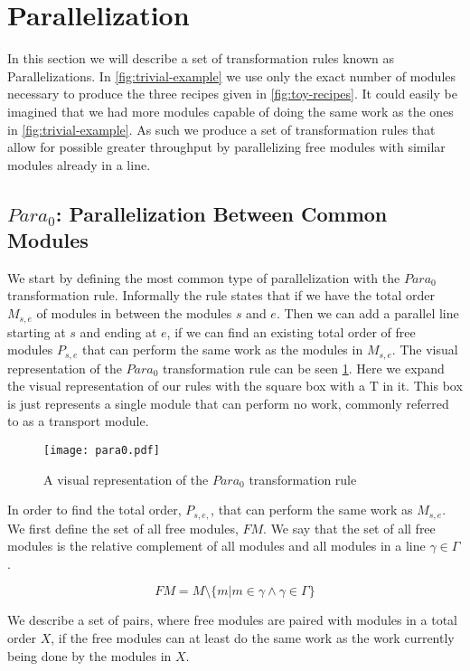 \section{Parallelization}
In this section we will describe a set of transformation rules known as Parallelizations. In \cref{fig:trivial-example} we use only the exact number of modules necessary to produce the three recipes given in \cref{fig:toy-recipes}. It could easily be imagined that we had more modules capable of doing the same work as the ones in \cref{fig:trivial-example}. As such we produce a set of transformation rules that allow for possible greater throughput by parallelizing free modules with similar modules already in a line.


\subsection{$Para_0$: Parallelization Between Common Modules}
We start by defining the most common type of parallelization with the $Para_0$ transformation rule. Informally the rule states that if we have the total order $M_{s,e}$ of modules in between the modules $s$ and $e$. Then we can add a parallel line starting at $s$ and ending at $e$, if we can find an existing total order of free modules $P_{s,e}$ that can perform the same work as the modules in $M_{s,e}$. The visual representation of the $Para_0$ transformation rule can be seen \cref{fig:para0}. Here we expand the visual representation of our rules with the square box with a T in it. This box is just represents a single module that can perform no work, commonly referred to as a transport module.

\begin{figure}[H]
	\centering
	\texttt{[image: para0.pdf]}
	\caption{A visual representation of the $Para_0$ transformation rule}
	\label{fig:para0}
\end{figure}

In order to find the total order, $P_{s,e,}$, that can perform the same work as $M_{s,e}$. We first define the set of all free modules, $FM$. We say that the set of all free modules is the relative complement of all modules and all modules in a line $\gamma \in \Gamma$.

\[FM = M \setminus \{m | m \in \gamma \land \gamma \in \Gamma\}\]

We describe a set of pairs, where free modules are paired with modules in a total order $X$, if the free modules can at least do the same work as the work currently being done by the modules in $X$.

